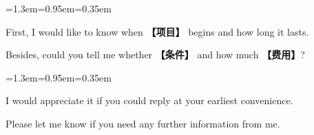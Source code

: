 \documentclass[10pt,a4paper]{ctexart}
\begin{document}
\par\vspace{1pt}
\begin{list}{}{\leftmargin=1.3em=0.95em=0.35em\itemindent=0pt\topsep=0pt\partopsep=0pt\parsep=1.5pt\itemsep=0pt}
\item[{\color{accent}\scriptsize$\blacktriangleright$}]{\footnotesize First, I would like to know when {\color{accent}\bfseries 【项目】} begins and how long it lasts.}\par{}
\item[{\color{accent}\scriptsize$\blacktriangleright$}]{\footnotesize Besides, could you tell me whether {\color{accent}\bfseries 【条件】} and how much {\color{accent}\bfseries 【费用】}?}\par{}
\end{list}
\par\vspace{1pt}
\begin{list}{}{\leftmargin=1.3em=0.95em=0.35em\itemindent=0pt\topsep=0pt\partopsep=0pt\parsep=1.5pt\itemsep=0pt}
\item[{\color{accent}\scriptsize$\blacktriangleright$}]{\footnotesize I would appreciate it if you could reply at your earliest convenience.}\par{}
\item[{\color{accent}\scriptsize$\blacktriangleright$}]{\footnotesize Please let me know if you need any further information from me.}\par{}
\end{list}
\par
\endgroup
\vspace{4pt}\par\nopagebreak
\end{document}
